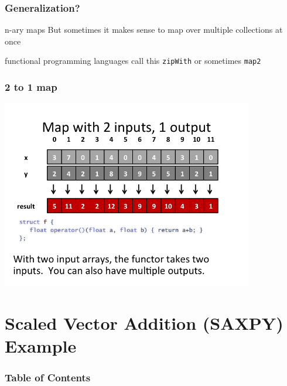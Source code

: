 \documentclass[xcolor=dvipsnames]{beamer}
\begin{document}
	\begin{frame} \frametitle{Generalization?}
		\begin{block}{n-ary maps}
			But sometimes it makes sense to map over multiple collections at 
            once 
		\end{block}
		functional programming languages call this \texttt{zipWith} or 
		sometimes \texttt{map2}
	\end{frame}
		
	\begin{frame} \frametitle{2 to 1 map}
		\includegraphics[width=110mm]{images/map2to1.png}
	\end{frame} 


\section{Scaled Vector Addition (SAXPY) Example} 

	\begin{frame} \frametitle{Table of Contents}
		\tableofcontents[currentsection]
	\end{frame} 
	
\end{document}
